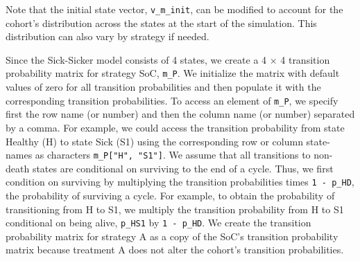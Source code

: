 \documentclass[
]{article}
\begin{document}
Note that the initial state vector, \texttt{v\_m\_init}, can be modified to account for the cohort's distribution across the states at the start of the simulation. This distribution can also vary by strategy if needed.

Since the Sick-Sicker model consists of 4 states, we create a 4 \(\times\) 4 transition probability matrix for strategy SoC, \texttt{m\_P}. We initialize the matrix with default values of zero for all transition probabilities and then populate it with the corresponding transition probabilities. To access an element of \texttt{m\_P}, we specify first the row name (or number) and then the column name (or number) separated by a comma. For example, we could access the transition probability from state Healthy (H) to state Sick (S1) using the corresponding row or column state-names as characters \texttt{m\_P{[}"H",\ "S1"{]}}. We assume that all transitions to non-death states are conditional on surviving to the end of a cycle. Thus, we first condition on surviving by multiplying the transition probabilities times \texttt{1\ -\ p\_HD}, the probability of surviving a cycle. For example, to obtain the probability of transitioning from H to S1, we multiply the transition probability from H to S1 conditional on being alive, \texttt{p\_HS1} by \texttt{1\ -\ p\_HD}. We create the transition probability matrix for strategy A as a copy of the SoC's transition probability matrix because treatment A does not alter the cohort's transition probabilities.
\end{document}
